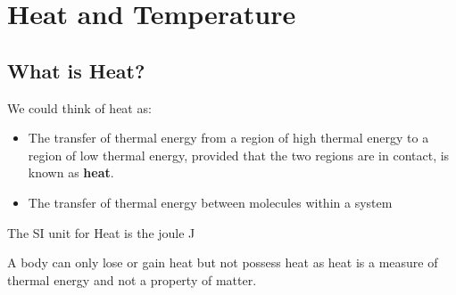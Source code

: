 \chapter{Heat and Temperature}
    \section{What is Heat?}
    We could think of heat as:
    \begin{itemize}
        \item The transfer of thermal energy from a region of high thermal
        energy to a region of low thermal energy, provided that the two regions
        are in contact, is known as \textbf{heat}.
        \item The transfer of thermal energy between molecules within a system
    \end{itemize}
    The SI unit for Heat is the joule \unit{J}
    \begin{tcolorbox}[colback=yellow!30!white,
                      colframe=yellow!70!black,
                      title={Just a heads up...}]
        A body can only lose or gain heat but not possess heat as heat is a
        measure of thermal energy and not a property of matter.
    \end{tcolorbox}

